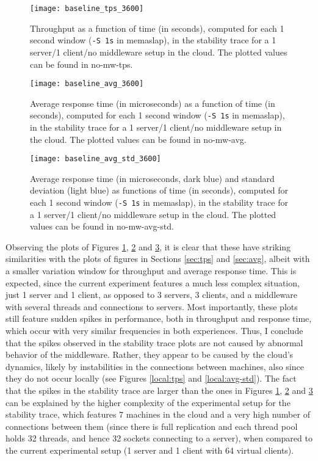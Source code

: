 \documentclass[11pt]{article}
\begin{document}
\begin{figure}[H]
	\centering
	\texttt{[image: baseline\_tps\_3600]}
	\caption{Throughput as a function of time (in seconds), computed for each 1 second window (\texttt{-S 1s} in memaslap), in the stability trace for a 1 server/1 client/no middleware setup in the cloud. The plotted values can be found in no-mw-tps.}
	\label{long:tps}
\end{figure}

\begin{figure}[H]
	\centering
	\texttt{[image: baseline\_avg\_3600]}
	\caption{Average response time (in microseconds) as a function of time (in seconds), computed for each 1 second window (\texttt{-S 1s} in memaslap), in the stability trace for a 1 server/1 client/no middleware setup in the cloud. The plotted values can be found in no-mw-avg.}
	\label{long:avg}
\end{figure}

\begin{figure}[h]
	\centering
	\texttt{[image: baseline\_avg\_std\_3600]}
	\caption{Average response time (in microseconds, dark blue) and standard deviation (light blue) as functions of time (in seconds), computed for each 1 second window (\texttt{-S 1s} in memaslap), in the stability trace for a 1 server/1 client/no middleware setup in the cloud. The plotted values can be found in no-mw-avg-std.}
	\label{long:avg-std}
\end{figure}

Observing the plots of Figures \ref{long:tps}, \ref{long:avg} and \ref{long:avg-std}, it is clear that these have striking similarities with the plots of figures in Sections \ref{sec:tps} and \ref{sec:avg}, albeit with a smaller variation window for throughput and average response time. This is expected, since the current experiment features a much less complex situation, just 1 server and 1 client, as opposed to 3 servers, 3 clients, and a middleware with several threads and connections to servers. Most importantly, these plots still feature sudden spikes in performance, both in throughput and response time, which occur with very similar frequencies in both experiences. Thus, I conclude that the spikes observed in the stability trace plots are not caused by abnormal behavior of the middleware. Rather, they appear to be caused by the cloud's dynamics, likely by instabilities in the connections between machines, also since they do not occur locally (see Figures \ref{local:tps} and \ref{local:avg-std}). The fact that the spikes in the stability trace are larger than the ones in Figures \ref{long:tps}, \ref{long:avg} and \ref{long:avg-std} can be explained by the higher complexity of the experimental setup for the stability trace, which features 7 machines in the cloud and a very high number of connections between them (since there is full replication and each thread pool holds 32 threads, and hence 32 sockets connecting to a server), when compared to the current experimental setup (1 server and 1 client with 64 virtual clients).
\end{document}
